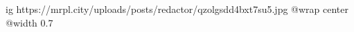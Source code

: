  
 
 
 
 

\ifcmt
  ig https://mrpl.city/uploads/posts/redactor/qzolgsdd4bxt7su5.jpg
  @wrap center
  @width 0.7
\fi
